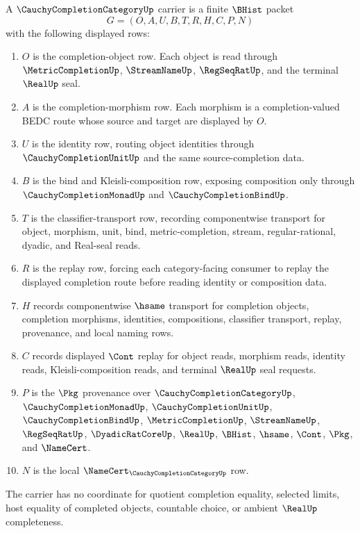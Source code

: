 \begin{definition}
\label{def:cauchy-completion-category-carrier}
A $\CauchyCompletionCategoryUp$ carrier is a finite $\BHist$ packet
$$
G=(O,A,U,B,T,R,H,C,P,N)
$$
with the following displayed rows:
\begin{enumerate}
\item $O$ is the completion-object row. Each object is read through $\MetricCompletionUp$, $\StreamNameUp$, $\RegSeqRatUp$, and the terminal $\RealUp$ seal.
\item $A$ is the completion-morphism row. Each morphism is a completion-valued BEDC route whose source and target are displayed by $O$.
\item $U$ is the identity row, routing object identities through $\CauchyCompletionUnitUp$ and the same source-completion data.
\item $B$ is the bind and Kleisli-composition row, exposing composition only through $\CauchyCompletionMonadUp$ and $\CauchyCompletionBindUp$.
\item $T$ is the classifier-transport row, recording componentwise transport for object, morphism, unit, bind, metric-completion, stream, regular-rational, dyadic, and Real-seal reads.
\item $R$ is the replay row, forcing each category-facing consumer to replay the displayed completion route before reading identity or composition data.
\item $H$ records componentwise $\hsame$ transport for completion objects, completion morphisms, identities, compositions, classifier transport, replay, provenance, and local naming rows.
\item $C$ records displayed $\Cont$ replay for object reads, morphism reads, identity reads, Kleisli-composition reads, and terminal $\RealUp$ seal requests.
\item $P$ is the $\Pkg$ provenance over $\CauchyCompletionCategoryUp$, $\CauchyCompletionMonadUp$, $\CauchyCompletionUnitUp$, $\CauchyCompletionBindUp$, $\MetricCompletionUp$, $\StreamNameUp$, $\RegSeqRatUp$, $\DyadicRatCoreUp$, $\RealUp$, $\BHist$, $\hsame$, $\Cont$, $\Pkg$, and $\NameCert$.
\item $N$ is the local $\NameCert_{\CauchyCompletionCategoryUp}$ row.
\end{enumerate}
The carrier has no coordinate for quotient completion equality, selected limits, host equality of completed objects, countable choice, or ambient $\RealUp$ completeness.
\end{definition}

